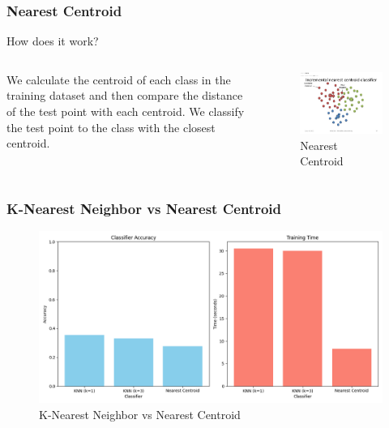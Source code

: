 \begin{frame}
\frametitle{Nearest Centroid}
\begin{center}
    How does it work?
\end{center}

\begin{columns}
    \begin{column}{0.5\textwidth}
        We calculate the centroid of each class in the training dataset and then compare the 
        distance of the test point with each centroid. We classify the test point to the class
        with the closest centroid.
    \end{column}

    \begin{column}{0.5\textwidth}
        \begin{figure}
            \centering
            \includegraphics[width=1\textwidth]{media/1stAssignment/centroid_example.jpg}
            \caption{Nearest Centroid}
        \end{figure}
    \end{column}
\end{columns}
\end{frame}

\begin{frame}
\frametitle{K-Nearest Neighbor vs Nearest Centroid}
\begin{figure}[H]
    \centering
    \includegraphics[width=1\textwidth]{media/2ndAssignment/knn_centroid.png}
    \caption{K-Nearest Neighbor vs Nearest Centroid}
\end{figure}
\end{frame}

